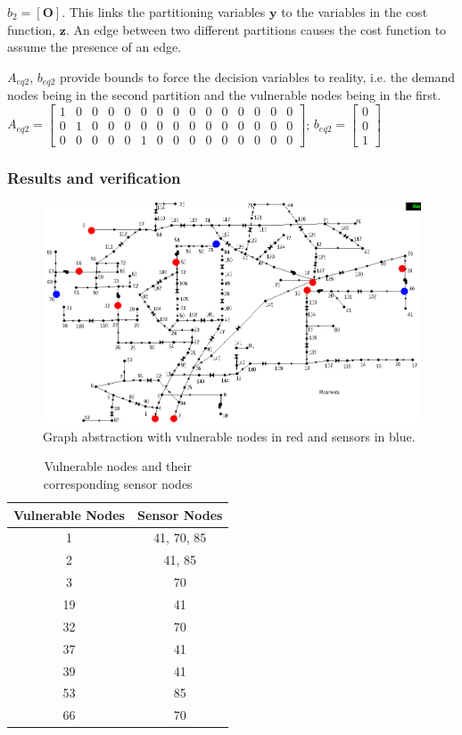 \documentclass[authoryear,preprint,review,12pt]{elsarticle}
\begin{document}
$b_{2}=\left[\mathbf{O}\right]$. This links the partitioning variables
$\mathbf{y}$ to the variables in the cost function, $\mathbf{z}$.
An edge between two different partitions causes the cost function
to assume the presence of an edge.

$A_{eq2}$, $b_{eq2}$ provide bounds to force the decision variables
to reality, i.e. the demand nodes being in the second partition and the vulnerable nodes being in the first. \\

$A_{eq2}=\left[\begin{array}{ccccccccccccccc}
1 & 0 & 0 & 0 & 0 & 0 & 0 & 0 & 0 & 0 & 0 & 0 & 0 & 0 & 0\\
0 & 1 & 0 & 0 & 0 & 0 & 0 & 0 & 0 & 0 & 0 & 0 & 0 & 0 & 0\\
0 & 0 & 0 & 0 & 0 & 1 & 0 & 0 & 0 & 0 & 0 & 0 & 0 & 0 & 0
\end{array}\right]$; $b_{eq2}=\left[\begin{array}{c}
0\\
0\\
1
\end{array}\right]$\\


\subsubsection{Results and verification}

\begin{figure}[ht]
\includegraphics[scale=0.4]{images/netowrkSensorsOnly}\caption{Graph abstraction with vulnerable nodes in red and sensors in blue.}
\end{figure}


\begin{table}[ht]
\centering{}%
\begin{tabular}{|c|c|}
\hline
Vulnerable Nodes & Sensor Nodes\tabularnewline
\hline
\hline
1 & 41, 70, 85\tabularnewline
\hline
2 & 41, 85\tabularnewline
\hline
3 & 70\tabularnewline
\hline
19 & 41\tabularnewline
\hline
32 & 70\tabularnewline
\hline
37 & 41\tabularnewline
\hline
39 & 41\tabularnewline
\hline
53 & 85\tabularnewline
\hline
66 & 70\tabularnewline
\hline
\end{tabular}\caption{Vulnerable nodes and their corresponding sensor nodes}
\end{table}
\end{document}
